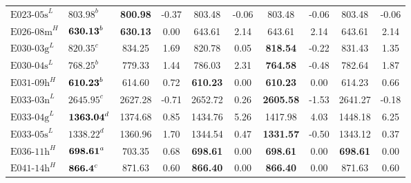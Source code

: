 \begin{table}[ht]
\begin{tabular}{@{}llcccccccc@{}}
		$\text{E023-05s}^L$ & $\text{803.98}^b$           & \textbf{800.98}                  & -0.37                      & 803.48                      & -0.06                      & 803.48           & -0.06        & 803.48          & -0.06        \\
		$\text{E026-08m}^H$ & $\text{\textbf{630.13}}^b$  & \textbf{630.13}                  & 0.00                       & 643.61                      & 2.14                       & 643.61           & 2.14         & 643.61          & 2.14         \\
		$\text{E030-03g}^L$ & $\text{820.35}^c$           & 834.25                           & 1.69                       & 820.78                      & 0.05                       & \textbf{818.54}  & -0.22        & 831.43          & 1.35         \\
		$\text{E030-04s}^L$ & $\text{768.25}^b$           & 779.33                           & 1.44                       & 786.03                      & 2.31                       & \textbf{764.58}  & -0.48        & 782.64          & 1.87         \\
		$\text{E031-09h}^H$ & $\text{\textbf{610.23}}^b$  & 614.60                           & 0.72                       & \textbf{610.23}             & 0.00                       & \textbf{610.23}  & 0.00         & 614.23          & 0.66         \\
		$\text{E033-03n}^L$ & $\text{2645.95}^c$          & 2627.28                          & -0.71                      & 2652.72                     & 0.26                       & \textbf{2605.58} & -1.53        & 2641.27         & -0.18        \\
		$\text{E033-04g}^L$ & $\text{\textbf{1363.04}}^d$ & 1374.68                          & 0.85                       & 1434.76                     & 5.26                       & 1417.98          & 4.03         & 1448.18         & 6.25         \\
		$\text{E033-05s}^L$ & $\text{1338.22}^d$          & 1360.96                          & 1.70                       & 1344.54                     & 0.47                       & \textbf{1331.57} & -0.50        & 1343.12         & 0.37         \\
		$\text{E036-11h}^H$ & $\text{\textbf{698.61}}^a$  & 703.35                           & 0.68                       & \textbf{698.61}             & 0.00                       & \textbf{698.61}  & 0.00         & \textbf{698.61} & 0.00         \\
		$\text{E041-14h}^H$ & $\text{\textbf{866.4}}^c$   & 871.63                           & 0.60                       & \textbf{866.40}             & 0.00                       & \textbf{866.40}  & 0.00         & 871.63          & 0.60         \\

\end{tabular}
\end{table}

